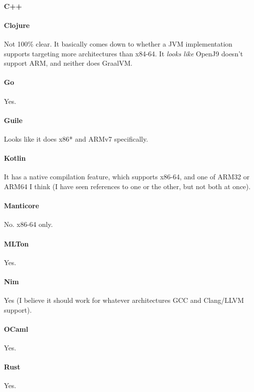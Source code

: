 \paragraph{C++}

\paragraph{Clojure}
Not 100\% clear.  It basically comes down to whether a JVM implementation supports targeting more architectures than x84-64.  It \emph{looks like} OpenJ9 doesn't support ARM, and neither does GraalVM.

\paragraph{Go}
Yes.

\paragraph{Guile}
Looks like it does x86* and ARMv7 specifically.

\paragraph{Kotlin}
It has a native compilation feature, which supports x86-64, and one of ARM32 or ARM64 I think (I have seen references to one or the other, but not both at once).

\paragraph{Manticore}
No.  x86-64 only.

\paragraph{MLTon}
Yes.

\paragraph{Nim}
Yes (I believe it should work for whatever architectures GCC and Clang/LLVM support).

\paragraph{OCaml}
Yes.


\paragraph{Rust}
Yes.

